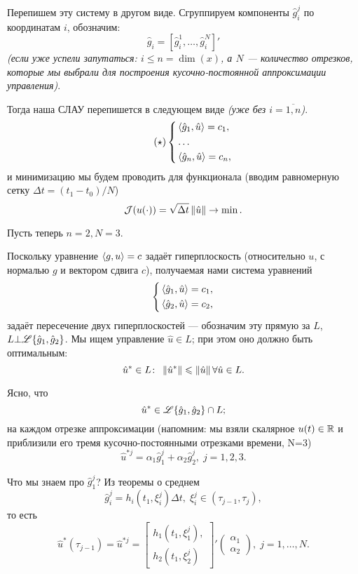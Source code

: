 Перепишем эту систему в другом виде.
Сгруппируем компоненты $\hat{g}^j_i$ по координатам $i$, обозначим:
$$
\hat{g}_i = [\hat{g}^1_i, \ldots,  \hat{g}^N_i]'
$$
\textit{(если уже успели запутаться: $i \leqslant n = \dim(x)$, а $N$ --- количество отрезков, которые мы выбрали для построения кусочно-постоянной аппроксимации управления)}.

Тогда наша СЛАУ перепишется в следующем виде \textit{(уже без $i = \overline{1, n}$)}.
\begin{equation} \tag{$\star$}
\left\{
    \begin{aligned}
        & \left < \hat{g}_1, \hat{u} \right > = c_1, \\
        & \ldots\\
        & \left < \hat{g}_n, \hat{u} \right > = c_n,
    \end{aligned}
\right.
\end{equation}
и минимизацию мы будем проводить для функционала (вводим равномерную сетку $\Delta t = (t_1 - t_0) / N$)
$$
\mathcal{J}(u(\cdot)) = \sqrt{\Delta t} \left\lVert \hat{u} \right\rVert \to \min.
$$

Пусть теперь $n = 2, N = 3$.

Поскольку уравнение $\left < g, u \right > = c$ задаёт гиперплоскость (относительно $u$, с нормалью $g$ и вектором сдвига $c$), получаемая нами система уравнений
$$
\left\{
    \begin{aligned}
        & \left < \hat{g}_1, \hat{u} \right > = c_1, \\
        & \left < \hat{g}_2, \hat{u} \right > = c_2,
    \end{aligned}
\right.
$$
задаёт пересечение двух гиперплоскостей --- обозначим эту прямую за $L$, $L \bot \mathscr{L} \{\hat{g}_1, \hat{g}_2\}$. Мы ищем управление $\hat{u} \in L$; при этом оно должно быть оптимальным:
$$
\hat{u}^* \in L \colon \; \left\lVert \hat{u}^* \right\rVert \leqslant \left\lVert \hat{u} \right\rVert \forall \hat{u} \in L.
$$

Ясно, что
$$
\hat{u}^* \in \mathscr{L} \{\hat{g}_1, \hat{g}_2\} \cap L;
$$
на каждом отрезке аппроксимации (напомним: мы взяли скалярное $u(t) \in \mathbb{R}$ и приблизили его тремя кусочно-постоянными отрезками времени, N=3)
$$
\hat{u}^{*j} = \alpha_1 \hat{g}_1^j + \alpha_2 \hat{g}_2^j, \; j = 1, 2, 3.
$$

Что мы знаем про $\hat{g}_1^j$? Из теоремы о среднем
$$
\hat{g}_i^j = h_i(t_1, \xi_i^j) \Delta t, \; \xi_i^j \in (\tau_{j-1}, \tau_{j}),
$$
то есть
$$
\hat{u}^{*}(\tau_{j-1}) = \hat{u}^{*j} =
\begin{bmatrix}
    h_1(t_1, \xi_1^j), \\
    h_2(t_1, \xi_2^j)    
\end{bmatrix}'
\begin{pmatrix}
    \alpha_1\\
    \alpha_2
\end{pmatrix},
\; j = 1, \ldots, N.
$$

